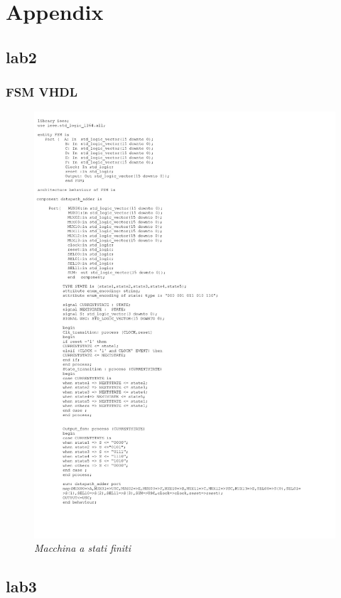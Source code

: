 \chapter{Appendix}
\section{lab2}
\subsection{FSM VHDL}
\begin{figure}[!htb]
	\centering
	\includegraphics[scale=0.2]{immagini/fsm}
	\caption{\textit{Macchina a stati finiti}}
	\label{fsm}
\end{figure}
\newpage
\section{lab3}
